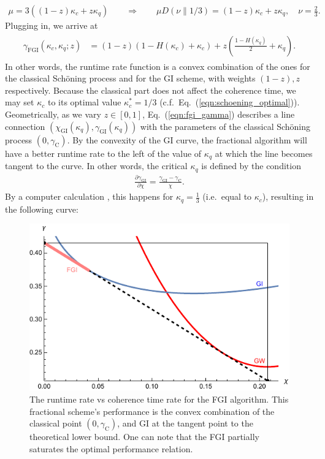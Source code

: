\documentclass[a4paper,aps,floatfix]{revtex4}
\begin{document}
\begin{align*}
	\mu = 3((1-z)\kappa_c + z \kappa_q)
	\qquad\Rightarrow\qquad
	\mu D(\nu \parallel 1/3) = (1-z)\kappa_c + z \kappa_q, \quad \nu=\frac23.
\end{align*}
Plugging in, we arrive at
\begin{align}
	\begin{split}\label{eqn:fgi_gamma}
		\gamma_{\textrm{FGI}}(\kappa_c, \kappa_q;z) 
		 &= 
		 (1-z)
		 \left(
			 1- H(\kappa_c)
			 +
			\kappa_c 
		 \right) 
		 + 
		 z\left(
			 \frac{1- H(\kappa_q)}2
			+  \kappa_q 
		 \right). 
	\end{split}
\end{align}
In other words, the runtime rate function is a convex combination of the ones for the classical Sch\"oning process and for the GI scheme, with weights $(1-z), z$ respectively.
Because the classical part does not affect the coherence time, we may set $\kappa_c$ to its optimal value $\kappa_c^*=1/3$
(c.f.\ Eq.~(\ref{eqn:schoening_optimal})).
Geometrically, as we vary $z\in[0,1]$, Eq.~(\ref{eqn:fgi_gamma}) describes a line connection $(\chi_{\mathrm{GI}}(\kappa_q), \gamma_{\mathrm{GI}}(\kappa_q))$ with the parameters of the classical Sch\"oning process $(0,\gamma_{\mathrm{C}})$.
By the convexity of the GI curve, the fractional algorithm will have a better runtime rate to the left of the value of $\kappa_q$ at which the line becomes tangent to the curve.
In other words, the critical $\kappa_q$ is defined by the condition
\begin{align*}
	\frac{\partial \gamma_\mathrm{GI}}{\partial\chi} = \frac{\gamma_\mathrm{GI}-\gamma_{\mathrm{C}}}{\chi}.
\end{align*}
By a computer calculation \cite{our-data}, this happens for $\kappa_q=\frac13$ (i.e.\ equal to $\kappa_c$), resulting in the following curve:
\begin{figure}[H]
\begin{center}
	\includegraphics[scale=.75]{images/fgi-tradeoffs}
   \end{center}
      \caption{The runtime rate vs coherence time rate for the FGI algorithm. This fractional scheme's performance is the convex combination of the classical point $(0,\gamma_\mathrm{C})$, and GI at the tangent point to the theoretical lower bound. One can note that the FGI partially saturates the optimal performance relation.}
\end{figure}
\end{document}
